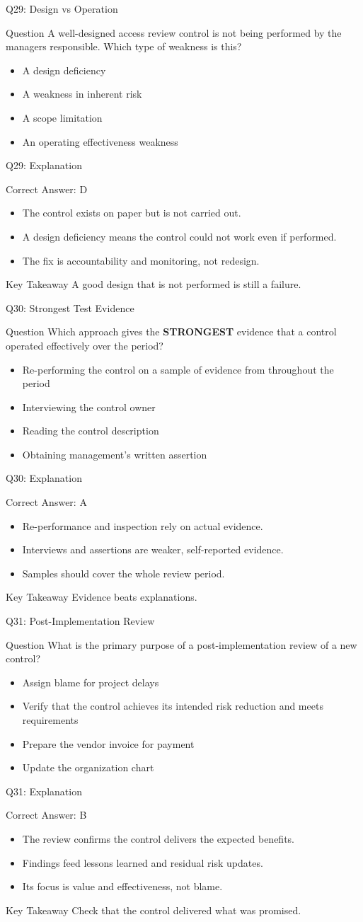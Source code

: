 \documentclass[aspectratio=169]{beamer}
\newcommand{\hq}[7]{%
	\begin{frame}{Q#1: #2}
		\begin{block}{Question}
			#3
		\end{block}
		\begin{itemize}
			#4
		\end{itemize}
	\end{frame}
	\begin{frame}{Q#1: Explanation}
		\begin{block}{Correct Answer: #5}
			\begin{itemize}
				#6
			\end{itemize}
		\end{block}
		\begin{alertblock}{Key Takeaway}
			#7
		\end{alertblock}
	\end{frame}
}
\begin{document}
	\hq{29}{Design vs Operation}
	{A well-designed access review control is not being performed by the managers responsible. Which type of weakness is this?}
	{\item[\textbf{(A)}] A design deficiency
		\item[\textbf{(B)}] A weakness in inherent risk
		\item[\textbf{(C)}] A scope limitation
		\item[\textbf{(D)}] An operating effectiveness weakness}
	{D}
	{\item The control exists on paper but is not carried out.
		\item A design deficiency means the control could not work even if performed.
		\item The fix is accountability and monitoring, not redesign.}
	{A good design that is not performed is still a failure.}
	
	\hq{30}{Strongest Test Evidence}
	{Which approach gives the \textbf{STRONGEST} evidence that a control operated effectively over the period?}
	{\item[\textbf{(A)}] Re-performing the control on a sample of evidence from throughout the period
		\item[\textbf{(B)}] Interviewing the control owner
		\item[\textbf{(C)}] Reading the control description
		\item[\textbf{(D)}] Obtaining management's written assertion}
	{A}
	{\item Re-performance and inspection rely on actual evidence.
		\item Interviews and assertions are weaker, self-reported evidence.
		\item Samples should cover the whole review period.}
	{Evidence beats explanations.}
	
	\hq{31}{Post-Implementation Review}
	{What is the primary purpose of a post-implementation review of a new control?}
	{\item[\textbf{(A)}] Assign blame for project delays
		\item[\textbf{(B)}] Verify that the control achieves its intended risk reduction and meets requirements
		\item[\textbf{(C)}] Prepare the vendor invoice for payment
		\item[\textbf{(D)}] Update the organization chart}
	{B}
	{\item The review confirms the control delivers the expected benefits.
		\item Findings feed lessons learned and residual risk updates.
		\item Its focus is value and effectiveness, not blame.}
	{Check that the control delivered what was promised.}
	
\end{document}
